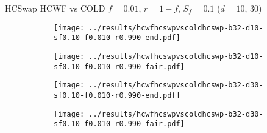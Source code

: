 \documentclass[8pt,a4paper]{beamer}
\begin{document}
		\begin{frame}{HCSwap HCWF vs COLD $f=0.01,\, r=1-f,\,S_f=0.1$  ($d=10,\, 30$)}
			\begin{figure}
				\begin{subfigure}{.48\textwidth}
					\centering
					\texttt{[image: ../results/hcwfhcswpvscoldhcswp-b32-d10-sf0.10-f0.010-r0.990-end.pdf]}
				\end{subfigure}
				\begin{subfigure}{.48\textwidth}
					\centering
					\texttt{[image: ../results/hcwfhcswpvscoldhcswp-b32-d10-sf0.10-f0.010-r0.990-fair.pdf]}
				\end{subfigure}
			\end{figure}
	
			\begin{figure}
				\begin{subfigure}{.48\textwidth}
					\centering
					\texttt{[image: ../results/hcwfhcswpvscoldhcswp-b32-d30-sf0.10-f0.010-r0.990-end.pdf]}
				\end{subfigure}
				\begin{subfigure}{.48\textwidth}
					\centering
					\texttt{[image: ../results/hcwfhcswpvscoldhcswp-b32-d30-sf0.10-f0.010-r0.990-fair.pdf]}
				\end{subfigure}
			\end{figure}
		\end{frame}
	
	
	
	
	
		
	
	
\end{document}
